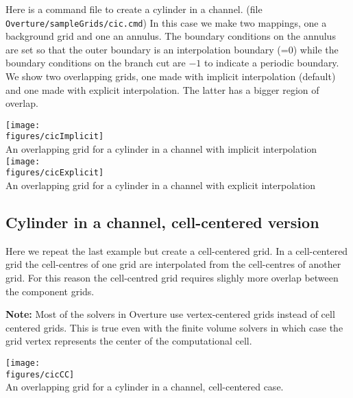 \documentclass[xcolor=rgb,svgnames,dvipsnames]{article}
\newcommand{\figures}{../fig}
\newcommand{\ogen}{\OvertureDir/ogen}
\begin{document}
Here is a command file to create a cylinder in a channel.
(file {\tt Overture/sampleGrids/cic.cmd})
In this case we make two mappings, one a background grid and one an
annulus. The boundary conditions on the annulus are set so that
the outer boundary is an interpolation boundary (=0) while the
boundary conditions on the branch cut are $-1$ to indicate a periodic
boundary. We show two overlapping grids, one made with implicit interpolation (default)
and one made with explicit interpolation. The latter has a bigger region of overlap.

\begin{minipage}{.4\linewidth}
{\footnotesize
\listinginput[1]{1}{\ogen /cic.cmd}
}
\end{minipage}\hfill
\begin{minipage}{.6\linewidth}
  \begin{center}
   \texttt{[image: \\figures/cicImplicit]}\\
  {An overlapping grid for a cylinder in a channel with implicit interpolation}  
   \texttt{[image: \\figures/cicExplicit]}\\
  {An overlapping grid for a cylinder in a channel with explicit interpolation}  \label{fig:cic}
  \end{center}
\end{minipage}

\clearpage
\subsection{Cylinder in a channel, cell-centered version }\label{sec:cylinderInAChannelCC}

Here we repeat the last example but create a cell-centered grid. 
In a cell-centered grid the cell-centres of one grid are interpolated
from the cell-centres of another grid. For this reason the cell-centred grid requires
slighly more overlap between the component grids.

{\bf Note:} Most of the solvers in Overture use vertex-centered grids instead of cell centered grids.
This is true even with the finite volume solvers in which case the grid vertex represents the center
of the computational cell. 

\begin{minipage}{.4\linewidth}
{\footnotesize
\listinginput[1]{1}{\ogen /cicCC.cmd}
}
\end{minipage}\hfill
\begin{minipage}{.6\linewidth}
  \begin{center}
   \texttt{[image: \\figures/cicCC]}\\
  {An overlapping grid for a cylinder in a channel, cell-centered case.}  \label{fig:cicCC}
  \end{center}
\end{minipage}
\end{document}

